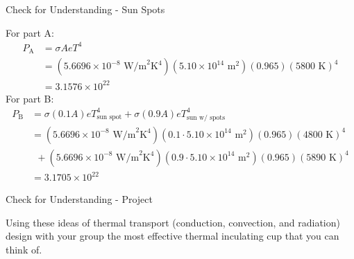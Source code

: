 \documentclass{beamer}
\begin{document}
\begin{frame}{Check for Understanding - Sun Spots}
\begin{center}
   For part A:
   \begin{align*}
      P_\text{A} &= \sigma A e T^4 \\
      &= (5.6696 \times 10^{-8}\text{ W/m}^2\text{K}^4)(5.10\times10^{14}\text{ m}^2)(0.965)(5800\text{ K})^4 \\
      &= 3.1576\times10^{22}
   \end{align*}
   For part B:
   \begin{align*}
      P_\text{B} &= \sigma (0.1 A) e T_\text{sun spot}^4 + \sigma (0.9 A) e T_\text{sun w/ spots}^4 \\
      &= (5.6696 \times 10^{-8}\text{ W/m}^2\text{K}^4)(0.1\cdot5.10\times10^{14}\text{ m}^2)(0.965)(4800\text{ K})^4 \\
      &~~+ (5.6696 \times 10^{-8}\text{ W/m}^2\text{K}^4)(0.9\cdot5.10\times10^{14}\text{ m}^2)(0.965)(5890\text{ K})^4 \\
      &= 3.1705\times10^{22}
   \end{align*}

\end{center}
\end{frame}

\begin{frame}{Check for Understanding - Project}
\begin{center}
   Using these ideas of thermal transport (conduction, convection, and radiation) design with your group the most effective thermal inculating cup that you can think of.
\end{center}
\end{frame}
\end{document}
